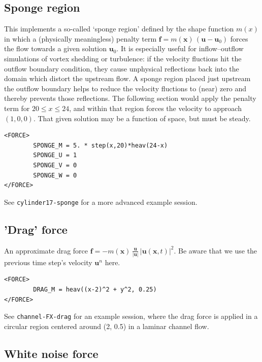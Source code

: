 \documentclass[11pt,a4paper]{report}
\begin{document}
\subsection{Sponge region}

This implements a so-called `sponge region' defined by the shape
function $m(x)$ in which a (physically meaningless) penalty term
$\bm{f} = m(\bm{x}) \, (\bm{u} - \bm{u}_0)$ forces the flow towards a
given solution $\bm{u}_0$.  It is especially useful for
inflow--outflow simulations of vortex shedding or turbulence: if the
velocity fluctions hit the outflow boundary condition, they cause
unphysical reflections back into the domain which distort the upstream
flow. A sponge region placed just upstream the outflow boundary helps
to reduce the velocity fluctions to (near) zero and thereby prevents
those reflections. The following section would apply the penalty term
for $20 \le x \le 24$, and within that region forces the velocity to
approach~$(1, 0, 0).$ That given solution may be a function of space,
but must be steady.
\begin{verbatim}
<FORCE>
        SPONGE_M = 5. * step(x,20)*heav(24-x)
        SPONGE_U = 1
        SPONGE_V = 0
        SPONGE_W = 0
</FORCE>
\end{verbatim}
See \verb|cylinder17-sponge| for a more advanced example session.

\subsection{'Drag' force}

An approximate drag force
$\bm{f} = - m(\bm{x}) \, \frac{\bm{u}}{|\bm{u}|} \, |\bm{u}(\bm{x},
t)|^2$.
Be aware that we use the previous time step's velocity $\bm{u}^{n}$ here.
\begin{verbatim}
<FORCE>
        DRAG_M = heav((x-2)^2 + y^2, 0.25)
</FORCE>
\end{verbatim}
See \verb+channel-FX-drag+ for an example session, where the drag
force is applied in a circular region centered around (2, 0.5) in a
laminar channel flow.

\subsection{White noise force}
\end{document}
